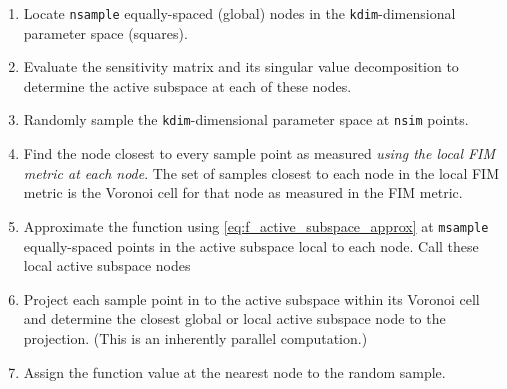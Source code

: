 \documentclass{siamltex}
\begin{document}
\begin{enumerate}
\item Locate {\tt nsample} equally-spaced (global) nodes in the {\tt kdim}-dimensional parameter space (squares).

\item Evaluate the sensitivity matrix and its singular value decomposition to determine the active subspace at each of these nodes.
    
\item Randomly sample the {\tt kdim}-dimensional parameter space  at {\tt nsim} points.

\item Find the node closest to every sample point as measured \emph{using the local FIM metric at each node}. The set of samples closest to each node in the local FIM metric is the Voronoi cell for that node as measured in the FIM metric.

\item Approximate the function using \eqref{eq:f_active_subspace_approx} at {\tt msample} equally-spaced points in the active subspace local to each node. Call these local active subspace nodes

\item Project each sample point in to the active subspace within its Voronoi cell and determine the closest global or local active subspace node to the projection. (This is an inherently parallel computation.)

\item  Assign the function value at the nearest node to the random sample.
\end{enumerate}


\end{document}
